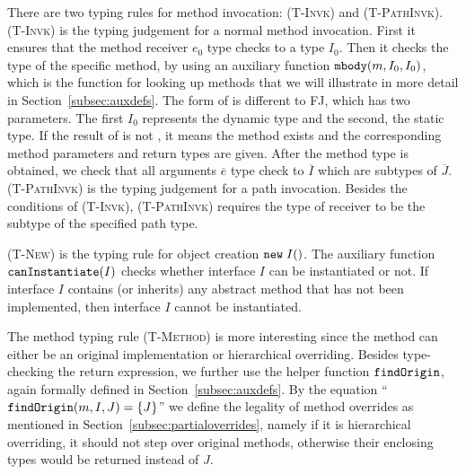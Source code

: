 There are two typing rules for method invocation: \textsc{(T-Invk)} and \textsc{(T-PathInvk)}. \textsc{(T-Invk)} is the typing judgement for a normal method invocation. First it ensures that the method receiver $e_0$ type checks to a type $I_0$. Then it checks the type of the specific method, by using an auxiliary function $\texttt{mbody}(m, I_0, I_0)$, which is the function for looking up methods that we will illustrate in more detail in Section~\ref{subsec:auxdefs}. The form of \mbody is different to FJ, which has two parameters. The first $I_0$ represents the dynamic type and the second, the static type. If the result of \mbody is not \Undefined, it means the method exists and the corresponding method parameters and return types are given. After the method type is obtained, we check that all arguments $\overline{e}$ type check to $\overline{I}$ which are subtypes of $\overline{J}$. \textsc{(T-PathInvk)} is the typing judgement for a path invocation. Besides the conditions of \textsc{(T-Invk)}, \textsc{(T-PathInvk)} requires the type of receiver to be the subtype of the specified path type. 

\textsc{(T-New)} is the typing rule for object creation $\texttt{new} \; I()$. The auxiliary function $\texttt{canInstantiate}(I)$ checks whether interface $I$ can be instantiated or not. If interface $I$ contains (or inherits) any abstract method that has not been implemented, then interface $I$ cannot be instantiated.

The method typing rule \textsc{(T-Method)} is more interesting since the method can either be an original implementation or hierarchical overriding.
Besides type-checking the return expression,
we further use the helper function $\texttt{findOrigin}$, again formally defined in Section~\ref{subsec:auxdefs}.
By the equation ``$\texttt{findOrigin}(m, I, J) = \{J\}$'' we define the legality of method overrides as mentioned in Section~\ref{subsec:partialoverrides}, namely if it is hierarchical overriding, it should not step over original methods, otherwise
their enclosing types would be returned instead of $J$.

